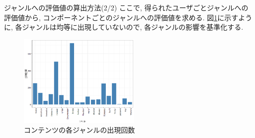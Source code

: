 \documentclass[dvipdfmx]{beamer} %
\newcommand{\backupend}{
\addtocounter{framenumberappendix}{-\value{framenumber}}
\addtocounter{framenumber}{\value{framenumberappendix}}
}
\begin{document}
\begin{frame}{ジャンルへの評価値の算出方法(2/2)}
\noindent
ここで, 得られたユーザごとジャンルへの評価値から, コンポーネントごとのジャンルへの評価値を求める. 図\ref{genre_count}に示すように, 各ジャンルは均等に出現していないので, 各ジャンルの影響を基準化する.

\vspace{0.5cm}
\begin{figure}[htbp]
\begin{center}
\includegraphics[clip,height= 45mm]{data/genre_count.png}
\end{center}
\caption{コンテンツの各ジャンルの出現回数}
\label{genre_count}
\end{figure}
\end{frame}
	
\backupend
\end{document}
